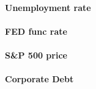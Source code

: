 \documentclass[hidelinks,12pts]{article}
\DeclareMathOperator{\1}{\mathbbm{1}}
\begin{document}
\paragraph{Unemployment rate}

\paragraph{FED func rate}

\paragraph{S\&P 500 price}

\paragraph{Corporate Debt }
\end{document}
